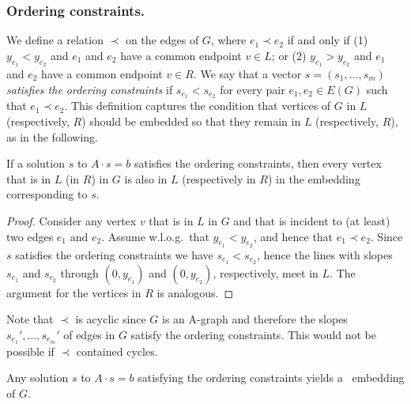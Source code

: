 \subsubsection{Ordering constraints.}
%
We define a relation $\prec$ on the edges of $G$, where $e_1 \prec e_2$ if and only if (1) $y_{e_1} < y_{e_2}$ and $e_1$ and $e_2$ have a common endpoint $v\in L$; or (2) $y_{e_1} > y_{e_2}$ and $e_1$ and $e_2$ have a common endpoint $v\in R$.
We say that a vector $s=(s_1,\ldots,s_m)$ \emph{satisfies the ordering
	constraints} if $s_{e_1} < s_{e_2}$ for every pair $e_1,e_2\in E(G)$
such that $e_1\prec e_2$. This definition captures the condition that vertices of $G$ in $L$ (respectively, $R$) should be embedded so that they remain in $L$ (respectively, $R$), as in the following. 

\begin{obs}
If a solution $s$ to $A\cdot s=b$ satisfies the ordering constraints, then every vertex that is in $L$ (in $R$) in $G$ is also in $L$ (respectively in $R$) in the embedding corresponding to $s$. 
\end{obs}

\begin{proof}	  
Consider any vertex $v$ that is in $L$ in $G$ and that is incident to (at least) two edges $e_1$ and $e_2$. Assume w.l.o.g.\ that $y_{e_1} < y_{e_2}$, and hence that $e_1 \prec e_2$. Since $s$ satisfies the ordering constraints we have $s_{e_1} < s_{e_2}$, hence the lines with slopes $s_{e_1}$ and $s_{e_2}$ through $(0,y_{e_1})$ and $(0,y_{e_2})$, respectively, meet in $L$. The argument for the vertices in $R$ is analogous. 
\end{proof}	  

Note that $\prec$ is acyclic since $G$ is an A-graph and therefore the slopes $s_{e_1}',\ldots,s_{e_m}'$ of edges
in $G$ satisfy the ordering constraints.  This would not be possible if $\prec$ contained cycles. 

\begin{lem}
	Any solution $s$ to $A\cdot s=b$ satisfying
	the ordering constraints %
	yields a
	\Fary\ embedding of $G$.
\end{lem}

